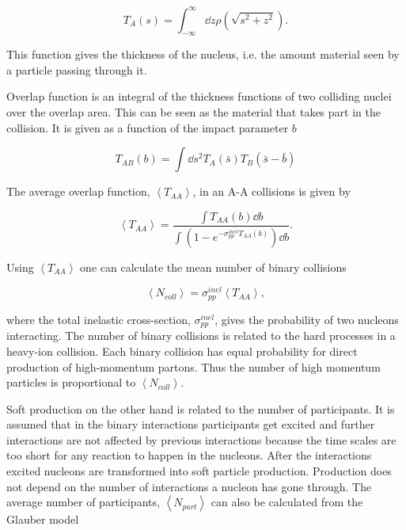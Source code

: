 \begin{equation}
T_A\left(s\right)=\int_{-\infty}^{\infty}\dd z \rho\left(\sqrt{s^2+z^2}\right).
\end{equation}

\noindent This function gives the thickness of the nucleus, i.e. the amount material seen by a particle passing through it. 

Overlap function is an integral of the thickness functions of two colliding nuclei over the overlap area. This can be seen as the material that takes part in the collision. It is given as a function of the impact parameter $b$

\begin{equation}
T_{AB}\left(b\right)=\int \dd  s^2 T_A\left(\bar s\right) T_B\left(\bar s - \bar b\right)
\end{equation}

\noindent The average overlap function, $\left<T_{AA}\right>$, in an A-A collisions  is given by~\cite{Afanasiev:2009aa}

\begin{equation}
\left<T_{AA}\right>=\frac{\int T_{AA}\left(b\right) \dd b}
{\int\left(1-e^{-\sigma^{inel}_{pp}T_{AA}\left(b\right)}\right)\dd b}.
\end{equation}

\noindent Using $\left<T_{AA}\right>$ one can calculate the mean number of binary collisions

\begin{equation}
\left<N_{coll}\right>=\sigma_{pp}^{inel}\left<T_{AA}\right>,
\end{equation}

\noindent where the total inelastic cross-section, $\sigma_{pp}^{inel}$, gives the probability of two nucleons interacting. The number of binary collisions is related to the hard processes in a heavy-ion collision. Each binary collision has equal probability for direct production of high-momentum partons. Thus the number of high momentum particles is proportional to $\left<N_{coll}\right>$.

Soft production on the other hand is related to the number of participants. It is assumed that in the binary interactions participants get excited and further interactions are not affected by previous interactions because the time scales are too short for any reaction to happen in the nucleons. After the interactions excited nucleons are transformed into soft particle production. Production does not depend on the number of interactions a nucleon has gone through. The average number of participants, $\left<N_{part}\right>$ can also be calculated from the Glauber model 


